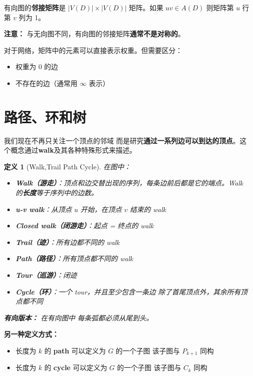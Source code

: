 \documentclass[12pt, a4paper]{article}
\newtheorem{definition}{定义}[section]
\begin{document}
有向图的\textbf{邻接矩阵}是 $|V(D)| \times |V(D)|$ 矩阵。如果 $uv \in A(D)$
则矩阵第 $u$ 行第 $v$ 列为 1。

\textbf{注意：} 与无向图不同，有向图的邻接矩阵\textbf{通常不是对称的}。

对于网络，矩阵中的元素可以直接表示权重。但需要区分：
\begin{itemize}
    \item 权重为 0 的边
    \item 不存在的边（通常用 $\infty$ 表示）
\end{itemize}


\newpage
\section{路径、环和树}

我们现在不再只关注一个顶点的邻域
而是研究\textbf{通过一系列边可以到达的顶点}。这个概念通过\textbf{walk}及其各种特殊形式来描述。

\begin{definition}[Walk,Trail
Path
Cycle]
在图中：
\begin{itemize}
    \item \textbf{Walk（游走）}：顶点和边交替出现的序列，每条边前后都是它的端点。Walk 的\textbf{长度}等于序列中的边数。
    \item \textbf{u-v walk}：从顶点 $u$ 开始，在顶点 $v$ 结束的 walk
    \item \textbf{Closed walk（闭游走）}：起点 = 终点的 walk
    \item \textbf{Trail（迹）}：所有边都不同的 walk
    \item \textbf{Path（路径）}：所有顶点都不同的 walk
    \item \textbf{Tour（巡游）}：闭迹
    \item \textbf{Cycle（环）}：一个 tour，并且至少包含一条边
除了首尾顶点外，其余所有顶点都不同
\end{itemize}

\textbf{有向版本：} 在有向图中
每条弧都必须从尾到头。
\end{definition}

\textbf{另一种定义方式：}
\begin{itemize}
    \item 长度为 $k$ 的 \textbf{path} 可以定义为 $G$ 的一个子图
该子图与 $P_{k+1}$ 同构
    \item 长度为 $k$ 的 \textbf{cycle} 可以定义为 $G$ 的一个子图
该子图与 $C_k$ 同构
\end{itemize}
\end{document}
